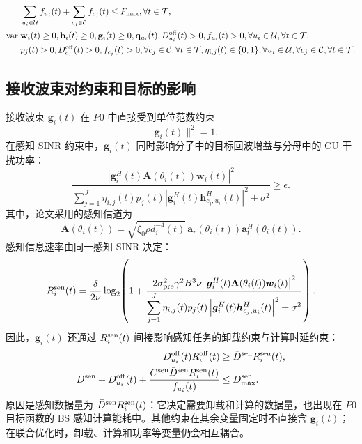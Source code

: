 \documentclass[11pt,a4paper]{ctexart}
\begin{document}
\begin{align}
    &
    \sum_{u_i\in\mathcal{U}}f_{u_i}(t)
    +\sum_{c_j\in\mathcal{C}}f_{c_j}(t)
    \leq F_{\max},
    \forall t\in\mathcal{T},
    \notag\\
    \text{var.}&
    \mathbf{w}_i(t)\geq0,
    \mathbf{b}_i(t)\geq0,
    \mathbf{g}_i(t)\geq0,
    \mathbf{q}_{u_i}(t),
    D_{u_i}^{\mathrm{off}}(t)>0,
    f_{u_i}(t)>0,
    \forall u_i\in\mathcal{U},
    \forall t\in\mathcal{T},
    \notag\\
    &
    p_j(t)>0,
    D_{c_j}^{\mathrm{off}}(t)>0,
    f_{c_j}(t)>0,
    \forall c_j\in\mathcal{C},
    \forall t\in\mathcal{T},
    \eta_{i,j}(t)\in\{0,1\},
    \forall u_i\in\mathcal{U},
    \forall c_j\in\mathcal{C},
    \forall t\in\mathcal{T}.
    \notag
\end{align}
\endgroup

\subsection{接收波束对约束和目标的影响}
接收波束 $\bm g_i(t)$ 在 $P0$ 中直接受到单位范数约束
\begin{equation}\label{eq:norm}
\|\bm g_i(t)\|^2=1.
\end{equation}
在感知 SINR 约束中，$\bm g_i(t)$ 同时影响分子中的目标回波增益与分母中的 CU 干扰功率：
\begin{equation}\label{eq:sinr}
\frac{\left|\bm g_i^H(t)\mathbf A(\theta_i(t))\bm w_i(t)\right|^2}
{\displaystyle\sum_{j=1}^{J}\eta_{i,j}(t)p_j(t)
\left|\bm g_i^H(t)\bm h_{c_j,u_i}^{H}(t)\right|^2+\sigma^2}\ge\epsilon.
\end{equation}
其中，论文采用的感知信道为
\begin{equation}\label{eq:A}
\mathbf A(\theta_i(t))=\sqrt{\xi_0\rho d_i^{-4}(t)}\,
\bm a_r(\theta_i(t))\bm a_t^H(\theta_i(t)).
\end{equation}
感知信息速率由同一感知 SINR 决定：
\begin{equation}\label{eq:rate}
R_i^{\rm sen}(t)=\frac{\delta}{2\nu}\log_2\!\left(
1+\frac{2\sigma_{\rm pre}^2\gamma^2B^3\nu
\left|\bm g_i^H(t)\mathbf A(\theta_i(t))\bm w_i(t)\right|^2}
{\displaystyle\sum_{j=1}^{J}\eta_{i,j}(t)p_j(t)
\left|\bm g_i^H(t)\bm h_{c_j,u_i}^{H}(t)\right|^2+\sigma^2}\right).
\end{equation}
因此，$\bm g_i(t)$ 还通过 $R_i^{\rm sen}(t)$ 间接影响感知任务的卸载约束与计算时延约束：
\begin{align}
D_{u_i}^{\rm off}(t)R_i^{\rm off}(t)&\ge\bar D^{\rm sen}R_i^{\rm sen}(t),\label{eq:impact-off}\\
\bar D^{\rm sen}+D_{u_i}^{\rm off}(t)+
\frac{C^{\rm sen}\bar D^{\rm sen}R_i^{\rm sen}(t)}{f_{u_i}(t)}
&\le D_{\max}^{\rm sen}.\label{eq:impact-delay}
\end{align}
原因是感知数据量为 $\bar D^{\rm sen}R_i^{\rm sen}(t)$：它决定需要卸载和计算的数据量，也出现在 $P0$ 目标函数的 BS 感知计算能耗中。其他约束在其余变量固定时不直接含 $\bm g_i(t)$；在联合优化时，卸载、计算和功率等变量仍会相互耦合。
\end{document}
